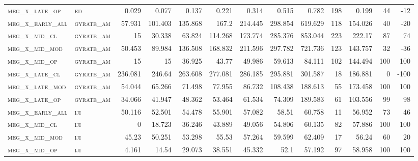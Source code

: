 \begin{landscape}
\begin{center}
\begin{footnotesize}
\begin{longtable}{llrrrrrrrr|rrr}
\textsc{meg\_x\_late\_op  } & \textsc{ed        }   & 0.029    & 0.077    & 0.137    & 0.221    & 0.314    & 0.515    & 0.782     & 198    & 0.199         & 44            & -12             \\
\textsc{meg\_x\_early\_all} & \textsc{gyrate\_am}   & 57.931   & 101.403  & 135.868  & 167.2    & 214.445  & 298.854  & 619.629   & 118    & 154.026       & 40            & -20             \\
\textsc{meg\_x\_mid\_cl   } & \textsc{gyrate\_am}   & 15       & 30.338   & 63.824   & 114.268  & 173.774  & 285.376  & 853.044   & 223    & 222.17        & 87            & 74              \\
\textsc{meg\_x\_mid\_mod  } & \textsc{gyrate\_am}   & 50.453   & 89.984   & 136.508  & 168.832  & 211.596  & 297.782  & 721.736   & 123    & 143.757       & 32            & -36             \\
\textsc{meg\_x\_mid\_op   } & \textsc{gyrate\_am}   & 15       & 15       & 36.925   & 43.77    & 49.986   & 59.613   & 84.111    & 102    & 144.494       & 100           & 100             \\
\textsc{meg\_x\_late\_cl  } & \textsc{gyrate\_am}   & 236.081  & 246.64   & 263.608  & 277.081  & 286.185  & 295.881  & 301.587   & 18     & 186.881       & 0             & -100            \\
\textsc{meg\_x\_late\_mod } & \textsc{gyrate\_am}   & 54.044   & 65.266   & 71.498   & 77.955   & 86.732   & 108.438  & 188.613   & 55     & 173.458       & 100           & 100             \\
\textsc{meg\_x\_late\_op  } & \textsc{gyrate\_am}   & 34.066   & 41.947   & 48.362   & 53.464   & 61.534   & 74.309   & 189.583   & 61     & 103.556       & 99            & 98              \\
\textsc{meg\_x\_early\_all} & \textsc{iji       }   & 50.116   & 52.501   & 54.478   & 55.901   & 57.082   & 58.51    & 60.758    & 11     & 56.952        & 73            & 46              \\
\textsc{meg\_x\_mid\_cl   } & \textsc{iji       }   & 0        & 18.723   & 36.246   & 43.889   & 49.056   & 54.806   & 60.135    & 82     & 57.886        & 100           & 100             \\
\textsc{meg\_x\_mid\_mod  } & \textsc{iji       }   & 45.23    & 50.251   & 53.298   & 55.53    & 57.264   & 59.599   & 62.409    & 17     & 56.24         & 60            & 20              \\
\textsc{meg\_x\_mid\_op   } & \textsc{iji       }   & 4.161    & 14.54    & 29.073   & 38.551   & 45.332   & 52.1     & 57.192    & 97     & 58.958        & 100           & 100             \\

\end{longtable}
\end{footnotesize}
\end{center}
\end{landscape}
